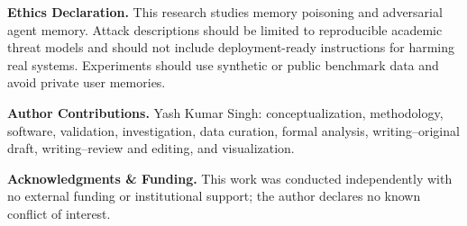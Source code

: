 \smallskip\noindent\textbf{Ethics Declaration.} This research studies memory poisoning and adversarial agent memory. Attack descriptions should be limited to reproducible academic threat models and should not include deployment-ready instructions for harming real systems. Experiments should use synthetic or public benchmark data and avoid private user memories.

\smallskip\noindent\textbf{Author Contributions.} Yash Kumar Singh: conceptualization, methodology, software, validation, investigation, data curation, formal analysis, writing--original draft, writing--review and editing, and visualization.

\smallskip\noindent\textbf{Acknowledgments \& Funding.} This work was conducted independently with no external funding or institutional support; the author declares no known conflict of interest.
